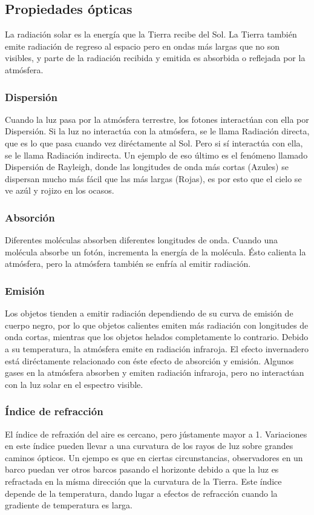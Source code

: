 \documentclass{article}
\begin{document}
\newpage

\subsection{Propiedades ópticas}
La radiación solar es la energía que la Tierra recibe del Sol. La Tierra también emite radiación de regreso al espacio pero en ondas más largas que no son visibles, y parte de la radiación recibida y emitida es absorbida o reflejada por la atmósfera.

\subsubsection{Dispersión}
Cuando la luz pasa por la atmósfera terrestre, los fotones interactúan con ella por Dispersión. Si la luz no interactúa con la atmósfera, se le llama Radiación directa, que es lo que pasa cuando vez diréctamente al Sol. Pero si sí interactúa con ella, se le llama Radiación indirecta.
Un ejemplo de eso último es el fenómeno llamado Dispersión de Rayleigh, donde las longitudes de onda más cortas (Azules) se dispersan mucho más fácil que las más largas (Rojas), es por esto que el cielo se ve azúl y rojizo en los ocasos.

\subsubsection{Absorción}
Diferentes moléculas absorben diferentes longitudes de onda. Cuando una molécula absorbe un fotón, incrementa la energía de la molécula.
Ésto calienta la atmósfera, pero la atmósfera también se enfría al emitir radiación.

\subsubsection{Emisión}
Los objetos tienden a emitir radiación dependiendo de su curva de emisión de cuerpo negro, por lo que objetos calientes emiten más radiación con longitudes de onda cortas, mientras que los objetos helados completamente lo contrario.
Debido a su temperatura, la atmósfera emite en radiación infraroja. El efecto invernadero está diréctamente relacionado con éste efecto de absorción y emisión. Algunos gases en la atmósfera absorben y emiten radiación infraroja, pero no interactúan con la luz solar en el espectro visible.
\subsubsection{Índice de refracción}
El índice de refraxión del aire es cercano, pero jústamente mayor a 1. Variaciones en este índice pueden llevar a una curvatura de los rayos de luz sobre grandes caminos ópticos. Un ejempo es que en ciertas circunstancias, observadores en un barco puedan ver otros barcos pasando el horizonte debido a que la luz es refractada en la mísma dirección que la curvatura de la Tierra.
Este índice depende de la temperatura, dando lugar a efectos de refracción cuando la gradiente de temperatura es larga.
\end{document}
